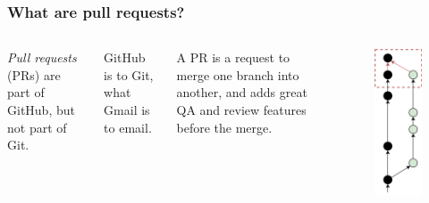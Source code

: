 \documentclass[aspectratio=169]{beamer}
\begin{document}
\begin{frame}
	\frametitle{What are pull requests?}
	\begin{columns}[c]
		
		
		\textit{Pull requests} (PRs) are part of GitHub, but not part of Git.	
		\vspace{2em}
		
		GitHub is to Git, what Gmail is to email.
		\vspace{2em}
		
		A PR is a request to merge one branch into another,
		and adds great QA and review features before the merge.
		
		\begin{minipage}[t][6.5cm][t]{\textwidth}
			\begin{figure}
				\centering
				\includegraphics[width=.55\textwidth]{./img/pr-highlight.png}
			\end{figure}
		\end{minipage}
		

\end{columns}
\end{frame}
\end{document}
